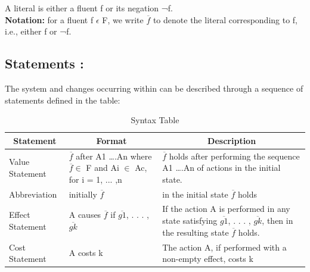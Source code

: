 \documentclass[11pt]{article}
\begin{document}
A literal is either a fluent f or its negation ¬f.\\
\textbf{Notation:} for a fluent f $\epsilon$ F, we write $\overline{f}$ to denote the literal corresponding to f, i.e., either f or ¬f.
\subsection{Statements :}\label{sec:Statements} 
	The system and changes occurring within can be described through a sequence of statements defined in the table:
	\begin{table}[H]
  \centering
    \begin{tabular}{|p{2cm}|p{4cm}|p{9cm}|}
    \hline
    \multicolumn{1}{|c|}{\textbf{Statement}} & \multicolumn{1}{c|}{\textbf{Format}} & \multicolumn{1}{c|}{\textbf{Description}} \\
    \hline
    Value Statement & $\overline{f}$ after A1 ….An where $\overline{f} \in$ F and Ai $\in$ Ac, for i = 1, ... ,n & $\overline{f}$ holds after performing the sequence A1 ….An of actions in the initial state. \\
    \hline
    Abbreviation & initially $\overline{f}$ & in the initial state $\overline{f}$ holds\\
    \hline
    Effect Statement & A causes $\overline{f}$ if $\overline{g1}$, . . . , $\overline{gk}$ & If the action A is performed in any state satisfying $\overline{g1}$, . . . , $\overline{gk}$, then in
    the resulting state $\overline{f}$ holds. \\
    \hline
    Cost Statement & A costs k & The action A, if performed with a non-empty effect, costs k \\
    \hline
    \end{tabular}
    \caption{Syntax Table}
  \label{tab:table01}
\end{table}
\end{document}

